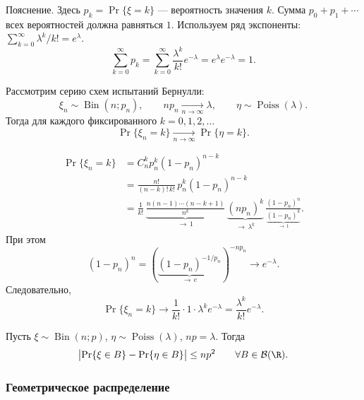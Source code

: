 \begingroup
\small
\setlength{\abovedisplayskip}{6pt}
\setlength{\belowdisplayskip}{6pt}
\noindent Пояснение.
Здесь $p_k=\Pr\{\xi=k\}$ --- вероятность значения $k$.
Сумма $p_0+p_1+\cdots$ всех вероятностей должна равняться $1$.
Используем ряд экспоненты:
$\textstyle\sum_{k=0}^{\infty}\lambda^k/k!=e^\lambda$.
\[
    \sum_{k=0}^{\infty}p_k
    =\sum_{k=0}^{\infty}\frac{\lambda^k}{k!}e^{-\lambda}
    =e^\lambda e^{-\lambda}=1.
\]
\par\endgroup

\begin{theorem}
    Рассмотрим серию схем испытаний Бернулли:
    \[
        \xi_n\sim\operatorname{Bin}(n;p_n),\qquad
        np_n\xrightarrow[n\to\infty]{}\lambda,\qquad
        \eta\sim\operatorname{Poiss}(\lambda).
    \]
    Тогда для каждого фиксированного $k=0,1,2,\ldots$
    \[
        \Pr\{\xi_n=k\}\xrightarrow[n\to\infty]{}\Pr\{\eta=k\}.
    \]
\end{theorem}

\begin{Proof}
    \[
        \begin{aligned}
            \Pr\{\xi_n=k\}
            &=C_n^k p_n^k(1-p_n)^{n-k}\\
            &=\frac{n!}{(n-k)!\,k!}\,p_n^k(1-p_n)^{n-k}\\
            &=\frac1{k!}\,
              \underbrace{\frac{n(n-1)\cdots(n-k+1)}{n^k}}
              _{\longrightarrow\,1}\,
              \underbrace{(np_n)^k}_{\longrightarrow\,\lambda^k}\,
              \frac{(1-p_n)^n}
              {\underbrace{(1-p_n)^k}_{\longrightarrow\,1}}.
        \end{aligned}
    \]
    При этом
    \[
        (1-p_n)^n
        =\left(\underbrace{(1-p_n)^{-1/p_n}}
        _{\longrightarrow\,e}\right)^{-np_n}
        \longrightarrow e^{-\lambda}.
    \]
    Следовательно,
    \[
        \Pr\{\xi_n=k\}\longrightarrow
        \frac1{k!}\cdot1\cdot\lambda^k e^{-\lambda}
        =\frac{\lambda^k}{k!}e^{-\lambda}.
    \]
\end{Proof}

\begin{theorem}[Обобщение]
    Пусть $\xi\sim\operatorname{Bin}(n;p)$,
    $\eta\sim\operatorname{Poiss}(\lambda)$, $np=\lambda$.
    Тогда
    \[
        \bigl|\Pr\{\xi\in B\}-\Pr\{\eta\in B\}\bigr|
        \leq np^2
        \qquad\forall B\in\mathcal{B}(\R).
    \]
\end{theorem}

\subsubsection{Геометрическое распределение}


